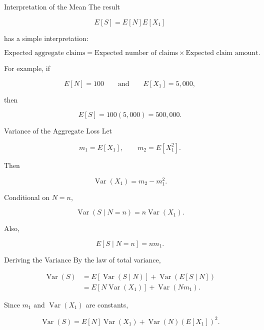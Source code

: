 \documentclass[
  ignorenonframetext,
  aspectratio=169,
]{beamer}
\begin{document}
\begin{frame}{Interpretation of the Mean}
\protect{}\label{interpretation-of-the-mean}
The result

\[
\boxed{E[S]=E[N]E[X_1]}
\]

has a simple interpretation:

\[
\text{Expected aggregate claims}
=
\text{Expected number of claims}
\times
\text{Expected claim amount}.
\]

For example, if

\[
E[N]=100
\qquad\text{and}\qquad
E[X_1]=5{,}000,
\]

then

\[
E[S]=100(5{,}000)=500{,}000.
\]
\end{frame}

\begin{frame}{Variance of the Aggregate Loss}
\protect{}\label{variance-of-the-aggregate-loss}
Let

\[
m_1=E[X_1],
\qquad
m_2=E[X_1^2].
\]

Then

\[
\operatorname{Var}(X_1)=m_2-m_1^2.
\]

Conditional on \(N=n\),

\[
\operatorname{Var}(S\mid N=n)
=
n\operatorname{Var}(X_1).
\]

Also,

\[
E[S\mid N=n]=nm_1.
\]
\end{frame}

\begin{frame}{Deriving the Variance}
\protect{}\label{deriving-the-variance}
By the law of total variance,

\[
\begin{aligned}
\operatorname{Var}(S)
&=E[\operatorname{Var}(S\mid N)]
+\operatorname{Var}(E[S\mid N])\\
&=E[N\operatorname{Var}(X_1)]
+\operatorname{Var}(Nm_1).
\end{aligned}
\]

Since \(m_1\) and \(\operatorname{Var}(X_1)\) are constants,

\[
\boxed{
\operatorname{Var}(S)
=
E[N]\operatorname{Var}(X_1)
+
\operatorname{Var}(N)(E[X_1])^2
}.
\]
\end{frame}
\end{document}
